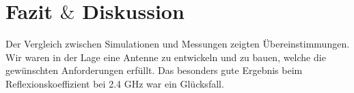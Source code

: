 \section{Fazit $\&$ Diskussion}
Der Vergleich zwischen Simulationen und Messungen zeigten Übereinstimmungen. Wir waren in der Lage eine Antenne zu entwickeln und zu bauen, welche die gewünschten Anforderungen erfüllt. Das besonders gute Ergebnis beim Reflexionskoeffizient bei 2.4 GHz war ein Glücksfall.